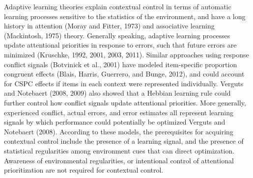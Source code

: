 \documentclass[]{DissertateCUNY}
\begin{document}
Adaptive learning theories explain contextual control in terms of
automatic learning processes sensitive to the statistics of the
environment, and have a long history in attention (Moray and Fitter,
1973) and associative learning (Mackintosh, 1975) theory. Generally
speaking, adaptive learning processes update attentional priorities in
response to errors, such that future errors are minimized (Kruschke,
1992, 2001, 2003, 2011). Similar approaches using response conflict
signals (Botvinick et al., 2001) have modeled item-specific proportion
congruent effects (Blais, Harris, Guerrero, and Bunge, 2012), and could
account for CSPC effects if items in each context were represented
individually. Verguts and Notebaert (2008, 2009) also showed that a
Hebbian learning rule could further control how conflict signals update
attentional priorities. More generally, experienced conflict, actual
errors, and error estimates all represent learning signals by which
performance could potentially be optimized Verguts and Notebaert (2008).
According to these models, the prerequisites for acquiring contextual
control include the presence of a learning signal, and the presence of
statistical regularities among environment cues that can direct
optimization. Awareness of environmental regularities, or intentional
control of attentional prioritization are not required for contextual
control.
\end{document}
